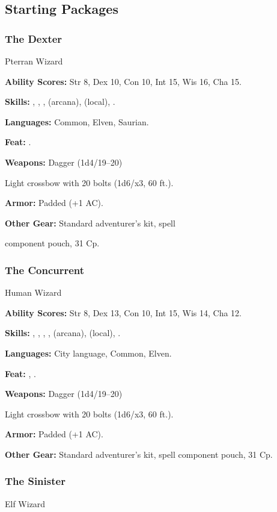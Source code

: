 \subsection{Starting Packages}
\subsubsection{The Dexter}
Pterran Wizard

\textbf{Ability Scores:} Str 8, Dex 10, Con 10, Int 15, Wis 16, Cha 15.

\textbf{Skills:} , , ,  (arcana),  (local), .

\textbf{Languages:} Common, Elven, Saurian.

\textbf{Feat:} .

\textbf{Weapons:} Dagger (1d4/19–20)

Light crossbow with 20 bolts (1d6/x3, 60 ft.).

\textbf{Armor:} Padded (+1 AC).

\textbf{Other Gear:} Standard adventurer's kit, spell

component pouch, 31 Cp.

\subsubsection{The Concurrent}
Human Wizard

\textbf{Ability Scores:} Str 8, Dex 13, Con 10, Int 15, Wis 14, Cha 12.

\textbf{Skills:} , , , ,  (arcana),  (local), .

\textbf{Languages:} City language, Common, Elven.

\textbf{Feat:} , .

\textbf{Weapons:} Dagger (1d4/19–20)

Light crossbow with 20 bolts (1d6/x3, 60 ft.).

\textbf{Armor:} Padded (+1 AC).

\textbf{Other Gear:} Standard adventurer's kit, spell component pouch, 31 Cp.

\subsubsection{The Sinister}
Elf Wizard

